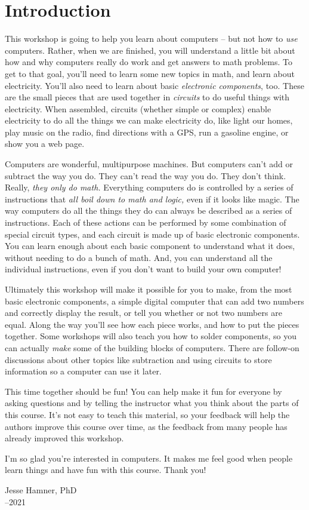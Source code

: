 \section{Introduction}

This workshop is going to help you learn about computers -- but not how to \emph{use} computers. Rather, when we are finished, you will understand a little bit about how and why computers really do work and get answers to math problems. To get to that goal, you'll need to learn some new topics in math, and learn about electricity. You'll also need to learn about basic \emph{electronic components}, too. These are the small pieces that are used together in \emph{circuits} to do useful things with electricity. When assembled, circuits (whether simple or complex) enable electricity to do all the things we can make electricity do, like light our homes, play music on the radio, find directions with a GPS, run a gasoline engine, or show you a web page.

Computers are wonderful, multipurpose machines. But computers can't add or subtract the way you do. They can't read the way you do. They don't think. Really,  \emph{they only do math.} Everything computers do is controlled by a series of instructions that \emph{all boil down to math and logic,} even if it looks like magic. The way computers do all the things they do can always be described as a series of instructions. Each of these actions can be performed by some combination of special circuit types, and each circuit is made up of basic electronic components. You can learn enough about each basic component to understand what it does, without needing to do a bunch of math. And, you can understand all the individual instructions, even if you don't want to build your own computer!

Ultimately this workshop will make it possible for you to make, from the most basic electronic components, a simple digital computer that can add two numbers and correctly display the result, or tell you whether or not two numbers are equal. Along the way you'll see how each piece works, and how to put the pieces together. Some workshops will also teach you how to solder components, so you can actually \emph{make} some of the building blocks of computers. There are follow-on discussions about other topics like subtraction and using circuits to store information so a computer can use it later.

This time together should be fun! You can help make it fun for everyone by asking questions and by telling the instructor what you think about the parts of this course. It's not easy to teach this material, so your feedback will help the authors improve this course over time, as the feedback from many people has already improved this workshop.

I'm so glad you're interested in computers. It makes me feel good when people learn things and have fun with this course. Thank you!

\noindent Jesse Hamner, PhD\\
--2021\\
